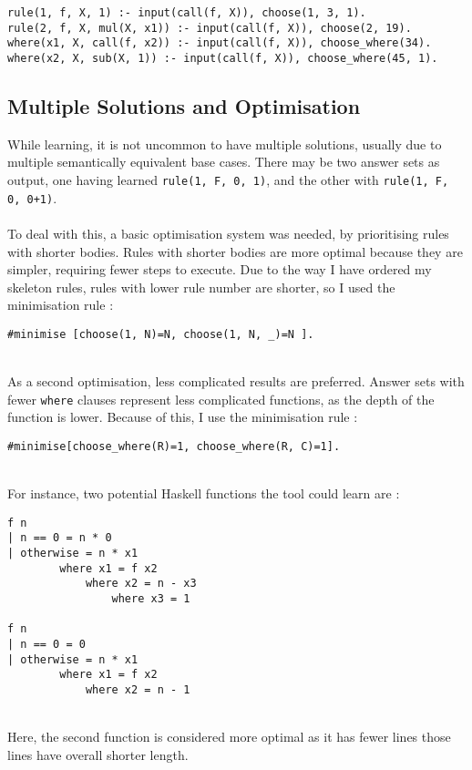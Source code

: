 \begin{lstlisting}
rule(1, f, X, 1) :- input(call(f, X)), choose(1, 3, 1).
rule(2, f, X, mul(X, x1)) :- input(call(f, X)), choose(2, 19).
where(x1, X, call(f, x2)) :- input(call(f, X)), choose_where(34).
where(x2, X, sub(X, 1)) :- input(call(f, X)), choose_where(45, 1).
\end{lstlisting}

\subsection{Multiple Solutions and Optimisation}
While learning, it is not uncommon to have multiple solutions, usually due to multiple semantically equivalent base cases. There may be two answer sets as output, one having learned \lstinline{rule(1, F, 0, 1)}, and the other with \lstinline{rule(1, F, 0, 0+1)}. \\ \\
To deal with this, a basic optimisation system was needed, by prioritising rules with shorter bodies. Rules with shorter bodies are more optimal because they are simpler, requiring fewer steps to execute. Due to the way I have ordered my skeleton rules,  rules with lower rule number are shorter, so I used the minimisation rule :

\begin{lstlisting}
#minimise [choose(1, N)=N, choose(1, N, _)=N ].
\end{lstlisting}
\mbox{}\\
As a second optimisation, less complicated results are preferred. Answer sets with fewer \lstinline{where} clauses represent less complicated functions, as the depth of the function is lower. Because of this, I use the minimisation rule : \\ %

\begin{lstlisting}
#minimise[choose_where(R)=1, choose_where(R, C)=1].
\end{lstlisting}
\mbox{}\\
For instance, two potential Haskell functions the tool could learn are : \\

\begin{lstlisting}
f n
| n == 0 = n * 0
| otherwise = n * x1
		where x1 = f x2
			where x2 = n - x3
				where x3 = 1 
				
f n
| n == 0 = 0
| otherwise = n * x1
		where x1 = f x2
			where x2 = n - 1
\end{lstlisting}
\mbox{}\\
Here, the second function is considered more optimal as it has fewer lines those lines have overall shorter length.

